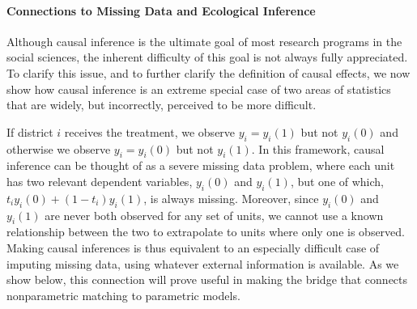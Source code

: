 \documentclass[11pt,titlepage]{article}
\begin{document}
\paragraph{Connections to Missing Data and Ecological Inference}
Although causal inference is the ultimate goal of most research
programs in the social sciences, the inherent difficulty of this goal
is not always fully appreciated.  To clarify this issue, and to
further clarify the definition of causal effects, we now show how
causal inference is an extreme special case of two areas of statistics
that are widely, but incorrectly, perceived to be more difficult.

If district $i$ receives the treatment, we observe $y_i=y_i(1)$ but
not $y_i(0)$ and otherwise we observe $y_i=y_i(0)$ but not $y_i(1)$.
In this framework, causal inference can be thought of as a severe
missing data problem, where each unit has two relevant dependent
variables, $y_i(0)$ and $y_i(1)$, but one of which, $t_iy_i(0) +
(1-t_i)y_i(1)$, is always missing.  Moreover, since $y_i(0)$ and
$y_i(1)$ are never both observed for any set of units, we cannot use a
known relationship between the two to extrapolate to units where only
one is observed.  Making causal inferences is thus equivalent to an
especially difficult case of imputing missing data, using whatever
external information is available.  As we show below, this connection
will prove useful in making the bridge that connects nonparametric
matching to parametric models.
\end{document}

